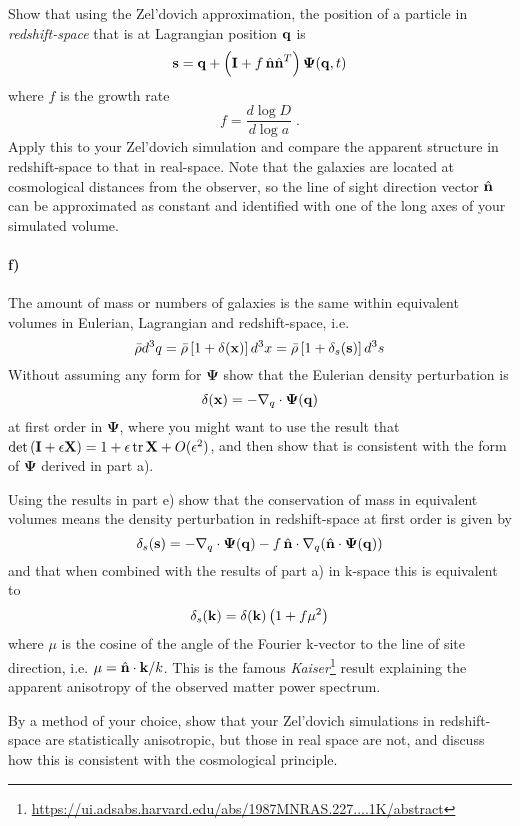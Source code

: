 \documentclass[12pt]{article}
\begin{document}
Show that using the Zel'dovich approximation, the position of a particle in \emph{redshift-space} that is at Lagrangian position ${\boldsymbol{\mathbf{q}}}$ is
\begin{equation}
{\boldsymbol{\mathbf{s}}} = {\boldsymbol{\mathbf{q}}} + \left(\mathbf{I} + f \, \hat{{\boldsymbol{\mathbf{n}}}} \hat{{\boldsymbol{\mathbf{n}}}}^T\right) \mathbf{\Psi}({\boldsymbol{\mathbf{q}}}, t)
\end{equation}
where $f$ is the growth rate
\begin{equation}
f = \frac{d \log D}{d \log a} \; .
\end{equation}
Apply this to your Zel'dovich simulation and compare the apparent structure in redshift-space to that in real-space. Note that the galaxies are located at cosmological distances from the observer, so the line of sight direction vector $\hat{{\boldsymbol{\mathbf{n}}}}$ can be approximated as constant and identified with one of the long axes of your simulated volume.

\paragraph{f)} The amount of mass or numbers of galaxies is the same within equivalent volumes in Eulerian, Lagrangian and redshift-space, i.e.
\begin{equation}
    \bar{\rho} d^3q = \bar{\rho} \left[ 1 + \delta({\boldsymbol{\mathbf{x}}})\right] d^3x = \bar{\rho} \left[ 1 + \delta_s({\boldsymbol{\mathbf{s}}})\right] d^3s
\end{equation}
Without assuming any form for $\mathbf{\Psi}$ show that the Eulerian density perturbation is
\begin{equation}
    \delta({\boldsymbol{\mathbf{x}}}) = - \nabla_q \cdot \mathbf{\Psi}({\boldsymbol{\mathbf{q}}})
\end{equation}
at first order in $\mathbf{\Psi}$, where you might want to use the result that $\det{({\boldsymbol{\mathbf{I}}}+ \epsilon {\boldsymbol{\mathbf{X}}})} = 1 + \epsilon \operatorname{tr}{{\boldsymbol{\mathbf{X}}}} + O(\epsilon^2)$, and then show that is consistent with the form of $\mathbf{\Psi}$ derived in part a).

Using the results in part e) show that the conservation of mass in equivalent volumes means the density perturbation in redshift-space at first order is given by
\begin{equation}
    \delta_s({\boldsymbol{\mathbf{s}}}) = -\nabla_q \cdot \mathbf{\Psi}({\boldsymbol{\mathbf{q}}}) - f \, \hat{{\boldsymbol{\mathbf{n}}}} \cdot \nabla_q (\hat{{\boldsymbol{\mathbf{n}}}} \cdot \mathbf{\Psi}({\boldsymbol{\mathbf{q}}}))
\end{equation}
and that when combined with the results of part a) in k-space this is equivalent to
\begin{equation}
    \delta_s({\boldsymbol{\mathbf{k}}}) = \delta({\boldsymbol{\mathbf{k}}}) \left( 1 + f \mu^2 \right)
\end{equation}
where $\mu$ is the cosine of the angle of the Fourier k-vector to the line of site direction, i.e. $\mu = \hat{{\boldsymbol{\mathbf{n}}}} \cdot {\boldsymbol{\mathbf{k}}} / k$. This is the famous \emph{Kaiser}\footnote{\url{https://ui.adsabs.harvard.edu/abs/1987MNRAS.227....1K/abstract}} result explaining the apparent anisotropy of the observed matter power spectrum.

By a method of your choice, show that your Zel'dovich simulations in redshift-space are statistically anisotropic, but those in real space are not, and discuss how this is consistent with the cosmological principle.
\end{document}
